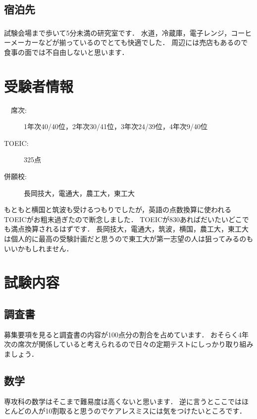 \documentclass[dvipdfmx]{jsarticle}
\begin{document}
\subsection{宿泊先}
\subsubsection*{}
試験会場まで歩いて5分未満の研究室です．
水道，冷蔵庫，電子レンジ，コーヒーメーカーなどが揃っているのでとても快適でした．
周辺には売店もあるので食事の面では不自由しないと思います．

\section{受験者情報}
\begin{description}
  \item[ 　席次:] 1年次40/40位，2年次30/41位，3年次24/39位，4年次9/40位
  \item[TOEIC:] 325点
  \item[ 併願校:] 長岡技大，電通大，農工大，東工大
\end{description}
もともと横国と筑波も受けるつもりでしたが，英語の点数換算に使われるTOEICがお粗末過ぎたので断念しました．
TOEICが830あればだいたいどこでも満点換算されるはずです．
長岡技大，電通大，筑波，横国，農工大，東工大は個人的に最高の受験計画だと思うので東工大が第一志望の人は狙ってみるのもいいかもしれません．


\section{試験内容}
\subsection{調査書}
募集要項を見ると調査書の内容が100点分の割合を占めています．
おそらく4年次の席次が関係していると考えられるので日々の定期テストにしっかり取り組みましょう．


\subsection{数学}
専攻科の数学はそこまで難易度は高くないと思います．
逆に言うとここではほとんどの人が10割取ると思うのでケアレスミスには気をつけたいところです．
\end{document}
